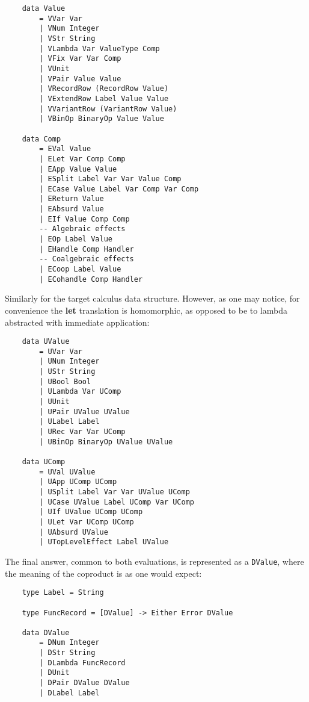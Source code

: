 \documentclass[declaration,shortabstract]{iithesis}
\theoremstyle{definition} \newtheorem{definition}{Definition}[chapter]
\theoremstyle{remark} \newtheorem{remark}[definition]{Observation}
\theoremstyle{plain} \newtheorem{theorem}[definition]{Theorem}
\theoremstyle{plain} \newtheorem{lemma}[definition]{Lemma}
\begin{document}
\begin{verbatim}
    data Value
        = VVar Var
        | VNum Integer
        | VStr String
        | VLambda Var ValueType Comp
        | VFix Var Var Comp
        | VUnit
        | VPair Value Value
        | VRecordRow (RecordRow Value)
        | VExtendRow Label Value Value
        | VVariantRow (VariantRow Value)
        | VBinOp BinaryOp Value Value

    data Comp
        = EVal Value
        | ELet Var Comp Comp
        | EApp Value Value
        | ESplit Label Var Var Value Comp
        | ECase Value Label Var Comp Var Comp
        | EReturn Value
        | EAbsurd Value
        | EIf Value Comp Comp
        -- Algebraic effects
        | EOp Label Value
        | EHandle Comp Handler
        -- Coalgebraic effects
        | ECoop Label Value
        | ECohandle Comp Handler
\end{verbatim}

    \noindent
    Similarly for the target calculus data structure. However, as one may notice,
    for convenience the \textbf{let} translation is homomorphic, as opposed to be
    to lambda abstracted with immediate application:

\begin{verbatim}
    data UValue
        = UVar Var
        | UNum Integer
        | UStr String
        | UBool Bool
        | ULambda Var UComp
        | UUnit
        | UPair UValue UValue
        | ULabel Label
        | URec Var Var UComp
        | UBinOp BinaryOp UValue UValue

    data UComp
        = UVal UValue
        | UApp UComp UComp
        | USplit Label Var Var UValue UComp
        | UCase UValue Label UComp Var UComp
        | UIf UValue UComp UComp
        | ULet Var UComp UComp
        | UAbsurd UValue
        | UTopLevelEffect Label UValue
\end{verbatim}

    \noindent
    The final answer, common to both evaluations, is represented as a \verb!DValue!,
    where the meaning of the coproduct is as one would expect:

\begin{verbatim}
    type Label = String

    type FuncRecord = [DValue] -> Either Error DValue

    data DValue
        = DNum Integer
        | DStr String
        | DLambda FuncRecord
        | DUnit
        | DPair DValue DValue
        | DLabel Label
\end{verbatim}
\end{document}
